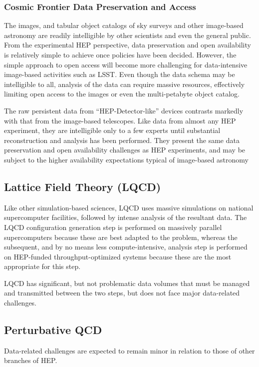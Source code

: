 \subsubsection{Cosmic Frontier Data Preservation and Access}

The images, and tabular object catalogs of sky surveys and other image-based astronomy 
are readily intelligible by other scientists and even the general public.  From the 
experimental HEP perspective, data preservation and open availability is relatively 
simple to achieve once policies have been decided.  However, the simple approach to open access will become more challenging for data-intensive image-based activities such as LSST.  Even though the data schema may be intelligible to all, analysis of the data can require massive resources, effectively limiting open access to the images or even the multi-petabyte object catalog.

The raw persistent data from ``HEP-Detector-like'' devices contrasts markedly with that from the 
image-based telescopes.  Like data from almost any HEP experiment, they are 
intelligible only to a few experts until substantial reconstruction and analysis 
has been performed.  They present the same data preservation and open availability 
challenges as HEP experiments, and may be subject to the higher availability 
expectations typical of image-based astronomy

\subsection{Lattice Field Theory (LQCD)}
Like other simulation-based sciences, LQCD uses massive simulations on national 
supercomputer facilities, followed by intense analysis of the resultant data.  The LQCD configuration generation step is performed on massively parallel supercomputers 
because these are best adapted to the problem, whereas the subsequent, and by no means less compute-intensive, analysis step is performed on HEP-funded 
throughput-optimized systems because these are the most appropriate for this step.

LQCD has significant, but not problematic data volumes that must be managed and transmitted 
between the two steps, but does not face major data-related challenges.

\subsection{Perturbative QCD}
Data-related challenges are expected to remain minor in relation to those of other branches of HEP.

